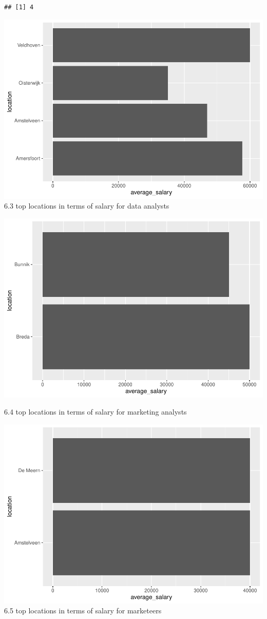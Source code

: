\documentclass[
]{article}
\begin{document}
\begin{verbatim}
## [1] 4
\end{verbatim}

\includegraphics{analysis_files/figure-latex/unnamed-chunk-36-1.pdf} 6.3
top locations in terms of salary for data analysts

\includegraphics{analysis_files/figure-latex/unnamed-chunk-37-1.pdf}

6.4 top locations in terms of salary for marketing analysts

\includegraphics{analysis_files/figure-latex/unnamed-chunk-38-1.pdf} 6.5
top locations in terms of salary for marketeers
\end{document}
